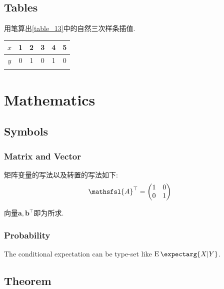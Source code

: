 \documentclass[a4paper, 12pt]{ctexart}
\let\oldtable\table
\let\oldendtable\endtable
\renewenvironment{table}
    {\par\nolinenumbers\oldtable}
    {\oldendtable\endnolinenumbers\par}
\theoremstyle{plain}
\theoremstyle{plain}
\theoremstyle{plain}
\theoremstyle{nonumberplain}
\newcommand{\expect}{\operatorname{E}\expectarg}
\newcommand{\matr}[1]{\ensuremath{\mathsfsl{#1}}} %
\newcommand{\vect}[1]{\bm{#1}}
\begin{document}
    \subsection{Tables}

    用笔算出\ref{table_13}中的自然三次样条插值.
    \begin{table}[H]
        \begin{center}
            \caption{习题中给定的三次样条数据}
            \label{table_13}
            \begin{tabular}{cccccc}
                \Xhline{1.2pt}
                $x$ & 1 & 2 & 3 & 4 & 5\\
                \hline
                $y$ & 0 & 1 & 0 & 1 & 0\\
                \Xhline{1.2pt}
            \end{tabular}
        \end{center}
    \end{table}

    \section{Mathematics}

    \subsection{Symbols}

    \subsubsection{Matrix and Vector}

    矩阵变量的写法以及转置的写法如下:
    \begin{equation}
        \matr{A}^{\top} =
        \begin{pmatrix}
            1 & 0\\
            0 & 1
        \end{pmatrix}
    \end{equation}

    向量$\vect{a}, \vect{b}^{\top}$即为所求.

    \subsubsection{Probability}

    The conditional expectation can be type-set like $\expect{X|Y}$.

    \subsection{Theorem}
\end{document}
